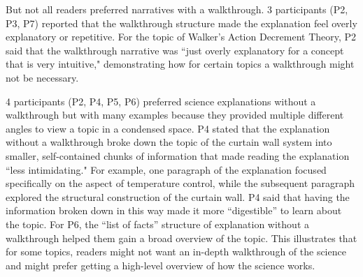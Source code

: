 But not all readers preferred narratives with a walkthrough. 3 participants (P2, P3, P7) reported that the walkthrough structure made the explanation feel overly explanatory or repetitive. For the topic of Walker's Action Decrement Theory, P2 said that the walkthrough narrative was ``just overly explanatory for a concept that is very intuitive," demonstrating how for certain topics a walkthrough might not be necessary.

4 participants (P2, P4, P5, P6) preferred science explanations without a walkthrough but with many examples because they provided multiple different angles to view a topic in a condensed space. P4 stated that the explanation without a walkthrough broke down the topic of the curtain wall system into smaller, self-contained chunks of information that made reading the explanation ``less intimidating." For example, one paragraph of the explanation focused specifically on the aspect of temperature control, while the subsequent paragraph explored the structural construction of the curtain wall. P4 said that having the information broken down in this way made it more ``digestible'' to learn about the topic. For P6, the ``list of facts'' structure of explanation without a walkthrough helped them gain a broad overview of the topic. This illustrates that for some topics, readers might not want an in-depth walkthrough of the science and might prefer getting a high-level overview of how the science works. 




